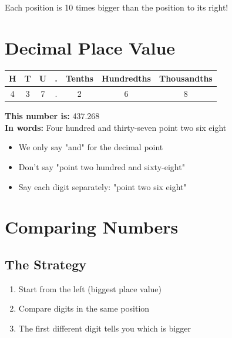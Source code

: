 \documentclass[a4paper,11pt]{article}
\begin{document}
\begin{tcolorbox}[colback=green!5!white,colframe=green!75!black,title=\textbf{Key Rule}]
Each position is 10 times bigger than the position to its right!
\end{tcolorbox}

\section{Decimal Place Value}

\begin{center}
\begin{tabular}{|c|c|c|c|c|c|c|}
\hline
\textbf{H} & \textbf{T} & \textbf{U} & \textbf{.} & \textbf{Tenths} & \textbf{Hundredths} & \textbf{Thousandths} \\
\hline
4 & 3 & 7 & . & 2 & 6 & 8 \\
\hline
\end{tabular}
\end{center}

\textbf{This number is:} 437.268
\\
\textbf{In words:} Four hundred and thirty-seven point two six eight

\begin{tcolorbox}[colback=orange!5!white,colframe=orange!75!black,title=\textbf{Important!}]
\begin{itemize}
    \item We only say "and" for the decimal point
    \item Don't say "point two hundred and sixty-eight"
    \item Say each digit separately: "point two six eight"
\end{itemize}
\end{tcolorbox}

\section{Comparing Numbers}

\subsection{The Strategy}
\begin{enumerate}
    \item Start from the left (biggest place value)
    \item Compare digits in the same position
    \item The first different digit tells you which is bigger
\end{enumerate}
\end{document}

